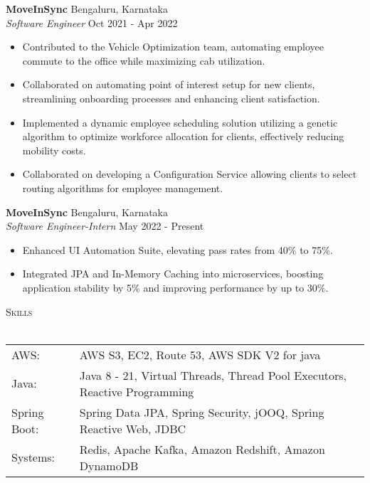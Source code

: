 \documentclass[a4paper]{article}
\newcommand{\lineunder} {
    \vspace*{-8pt} \\
    \hspace*{-18pt} \hrulefill \\
}
\newcommand{\header} [1] {
    {\hspace*{-18pt}\vspace*{6pt} \textsc{#1}}
    \vspace*{-6pt} \lineunder
}
\begin{document}
\textbf{MoveInSync} \hfill Bengaluru, Karnataka\\
\textit{Software Engineer} \hfill Oct 2021 - Apr 2022\\
\vspace{-1mm}
\begin{itemize} \itemsep 1pt
	\item Contributed to the Vehicle Optimization team, automating employee commute to the office while maximizing cab utilization.
	\item Collaborated on automating point of interest setup for new clients, streamlining onboarding processes and enhancing client satisfaction.
	\item Implemented a dynamic employee scheduling solution utilizing a genetic algorithm to optimize workforce allocation for clients, effectively reducing mobility costs.
	\item Collaborated on developing a Configuration Service allowing clients to select routing algorithms for employee management.
\end{itemize}
\textbf{MoveInSync} \hfill Bengaluru, Karnataka\\
\textit{Software Engineer-Intern} \hfill May 2022 - Present\\
\vspace{-1mm}
\begin{itemize} \itemsep 1pt
	\item Enhanced UI Automation Suite, elevating pass rates from 40\% to 75\%.
	\item Integrated JPA and In-Memory Caching into microservices, boosting application stability by 5\% and improving performance by up to 30\%.
\end{itemize}

\header{Skills}
\begin{tabular}{ l l }
	AWS:         & AWS S3, EC2, Route 53, AWS SDK V2 for java                                \\
	Java:        & Java 8 - 21, Virtual Threads, Thread Pool Executors, Reactive Programming \\
	Spring Boot: & Spring Data JPA, Spring Security, jOOQ, Spring Reactive Web, JDBC         \\
    Systems:     & Redis, Apache Kafka, Amazon Redshift, Amazon DynamoDB                     \\
\end{tabular}
\vspace{2mm}
\end{document}
